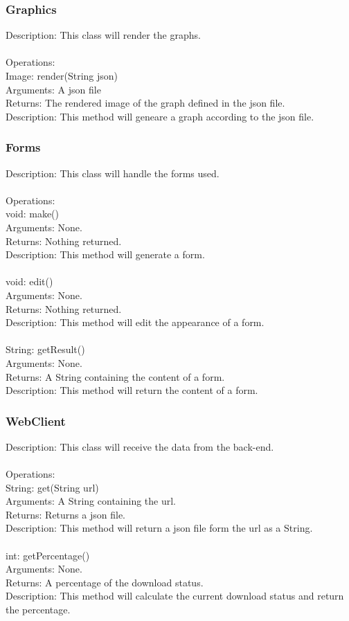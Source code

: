 \documentclass[12pt]{extarticle}
\begin{document}
\subsubsection{Graphics}
Description: This class will render the graphs. \\ \\
Operations: \\
    Image: render(String json) \\
    Arguments: A json file \\
	Returns: The rendered image of the graph defined in the json file. \\
	Description: This method will geneare a graph according to the json file. \\

\subsubsection{Forms}
Description: This class will handle the forms used. \\ \\
Operations: \\
    void: make() \\
    Arguments: None. \\
	Returns: Nothing returned. \\
	Description: This method will generate a form. \\ \\
	void: edit() \\
    Arguments: None. \\
	Returns: Nothing returned. \\
	Description: This method will edit the appearance of a form. \\ \\
	String: getResult() \\
    Arguments: None. \\
	Returns: A String containing the content of a form. \\
	Description: This method will return the content of a form. \\

\subsubsection{WebClient}
Description: This class will receive the data from the back-end. \\ \\
Operations: \\
    String: get(String url) \\
    Arguments: A String containing the url. \\
	Returns: Returns a json file. \\
	Description: This method will return a json file form the url as a String. \\ \\
	int: getPercentage() \\
    Arguments: None. \\
	Returns: A percentage of the download status. \\
	Description: This method will calculate the current download status and return the percentage. \\
\end{document}
